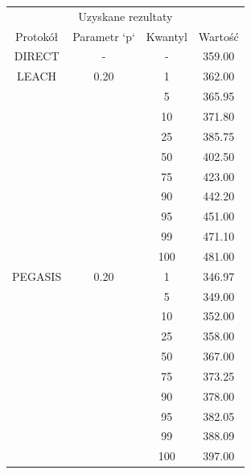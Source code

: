 \documentclass[a4paper,12pt,twoside,openany]{report}
\begin{document}
\begin{longtable}{*{4}{c}}
\toprule
\multicolumn{4}{c}{Uzyskane rezultaty} \\
Protokół	& Parametr `p`	& Kwantyl	& Wartość \\
\midrule
\endhead
DIRECT	& - 	& -	& 359.00 \\*
\midrule
LEACH	& 0.20	& 1	& 362.00 \\*
	&	& 5	& 365.95 \\*
	&	& 10	& 371.80 \\*
	&	& 25	& 385.75 \\*
	&	& 50	& 402.50 \\*
	&	& 75	& 423.00 \\*
	&	& 90	& 442.20 \\*
	&	& 95	& 451.00 \\*
	&	& 99	& 471.10 \\*
	&	& 100	& 481.00 \\*
\midrule
PEGASIS	& 0.20	& 1	& 346.97 \\*
	&	& 5	& 349.00 \\*
	&	& 10	& 352.00 \\*
	&	& 25	& 358.00 \\*
	&	& 50	& 367.00 \\*
	&	& 75	& 373.25 \\*
	&	& 90	& 378.00 \\*
	&	& 95	& 382.05 \\*
	&	& 99	& 388.09 \\*
	&	& 100	& 397.00 \\*
\bottomrule
\end{longtable}
\end{document}
